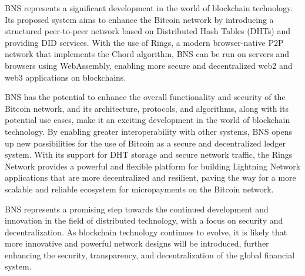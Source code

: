 \documentclass[twocolumn]{article}
\begin{document}
BNS represents a significant development in the world of blockchain technology. Its proposed system aims to enhance the Bitcoin network by introducing a structured peer-to-peer network based on Distributed Hash Tables (DHTs) and providing DID services. With the use of Rings, a modern browser-native P2P network that implements the Chord algorithm, BNS can be run on servers and browsers using WebAssembly, enabling more secure and decentralized web2 and web3 applications on blockchains.

BNS has the potential to enhance the overall functionality and security of the Bitcoin network, and its architecture, protocols, and algorithms, along with its potential use cases, make it an exciting development in the world of blockchain technology. By enabling greater interoperability with other systems, BNS opens up new possibilities for the use of Bitcoin as a secure and decentralized ledger system. With its support for DHT storage and secure network traffic, the Rings Network provides a powerful and flexible platform for building Lightning Network applications that are more decentralized and resilient, paving the way for a more scalable and reliable ecosystem for micropayments on the Bitcoin network.

BNS represents a promising step towards the continued development and innovation in the field of distributed technology, with a focus on security and decentralization. As blockchain technology continues to evolve, it is likely that more innovative and powerful network designs will be introduced, further enhancing the security, transparency, and decentralization of the global financial system.



\end{document}
